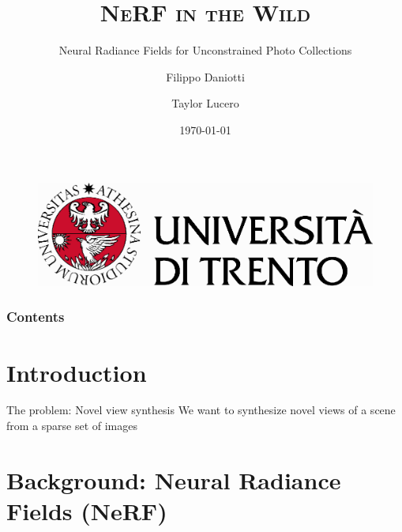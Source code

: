 \documentclass[aspectratio=1610]{beamer}
\author[Daniotti \and Lucero]{Filippo Daniotti \and Taylor Lucero}
\title[NeRF-W]{\textsc{NeRF in the Wild}}
\subtitle{Neural Radiance Fields for Unconstrained Photo Collections}
\institute[DISI - UniTN]{Department of Information Engineering\\and Computer Science}
\date{\today}
\begin{document}
\begin{frame}
    \titlepage
    \begin{figure}[H]
        \begin{center}
            \includegraphics[width=0.4\linewidth]{marchio_unitrento_colore_it_202002.eps}
        \end{center}
    \end{figure}
\end{frame}


\begin{frame}
    \frametitle{Contents}
    \tableofcontents[sectionstyle=show,subsectionstyle=show,subsubsectionstyle=show/shaded/hide]
\end{frame}

\section{Introduction}
\begin{frame}{The problem: Novel view synthesis}
    We want to synthesize novel views of a scene from a sparse set of images  
    \begin{figure}[H]
    \end{figure}
\end{frame}


\section{Background: Neural Radiance Fields (NeRF)}
\end{document}
